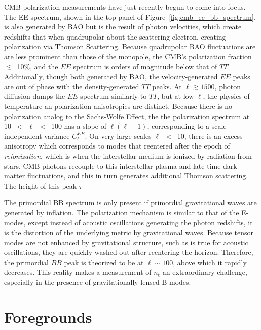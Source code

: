 CMB polarization measurements have just recently begun to come into focus. The EE spectrum, shown in the top panel of Figure~\ref{fig:cmb_ee_bb_spectrum}, is also generated by BAO but is the result of photon velocities, which create redshifts that when quadrupolar about the scattering electron, creating polarization via Thomson Scattering. Because quadrupolar BAO fluctuations are are less prominent than those of the monopole, the CMB's polarization fraction $\lesssim$~10\%, and the $EE$ spectrum is orders of magnitude below that of $TT$. Additionally, though both generated by BAO, the velocity-generated $EE$ peaks are out of phase with the density-generated $TT$ peaks. At $\ell \gtrsim 1500$, photon diffusion damps the $EE$ spectrum similarly to $TT$, but at low-$\ell$, the physics of temperature an polarization anisotropies are distinct. Because there is no polarization analog to the Sachs-Wolfe Effect, the the polarization spectrum at 10~$<$~$\ell$~$<$~100 has a slope of $\ell (\ell + 1)$, corresponding to a scale-independent variance $C_{\ell}^{EE}$. On very large scales $\ell$~$<$~10, there is an excess anisotropy which corresponds to modes that reentered after the epoch of \textit{reionization}, which is when the interstellar medium is ionized by radiation from stars. CMB photons recouple to this interstellar plasma and late-time dark matter fluctuations, and this in turn generates additional Thomson scattering. The height of this peak  $\tau$  

The primordial BB spectrum is only present if primordial gravitational waves are generated by inflation. The polarization mechanism is similar to that of the E-modes, except instead of acoustic oscillations generating the photon redshifts, it is the distortion of the underlying metric by gravitational waves. Because tensor modes are not enhanced by gravitational structure, such as is true for acoustic oscillations, they are quickly washed out after reentering the horizon. Therefore, the primordial $BB$ peak is theorized to be at $\ell \sim 100$, above which it rapidly decreases. This reality makes a measurement of $n_{\mathrm{t}}$ an extraordinary challenge, especially in the presence of gravitationally lensed B-modes.


\section{Foregrounds}
\label{sec:foregrounds}

